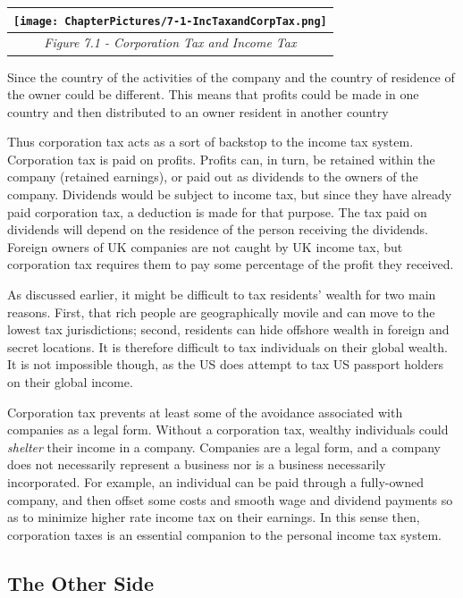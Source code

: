 \documentclass[]{tufte-handout}
\begin{document}
\begin{longtable}[]{@{}c@{}}
\toprule
\texttt{[image: ChapterPictures/7-1-IncTaxandCorpTax.png]}\tabularnewline
\midrule
\endhead
\emph{Figure 7.1 - Corporation Tax and Income Tax}\tabularnewline
\bottomrule
\end{longtable}

Since the country of the activities of the company and the country of
residence of the owner could be different. This means that profits could
be made in one country and then distributed to an owner resident in
another country

Thus corporation tax acts as a sort of backstop to the income tax
system. Corporation tax is paid on profits. Profits can, in turn, be
retained within the company (retained earnings), or paid out as
dividends to the owners of the company. Dividends would be subject to
income tax, but since they have already paid corporation tax, a
deduction is made for that purpose. The tax paid on dividends will
depend on the residence of the person receiving the dividends. Foreign
owners of UK companies are not caught by UK income tax, but corporation
tax requires them to pay some percentage of the profit they received.

As discussed earlier, it might be difficult to tax residents' wealth for
two main reasons. First, that rich people are geographically movile and
can move to the lowest tax jurisdictions; second, residents can hide
offshore wealth in foreign and secret locations. It is therefore
difficult to tax individuals on their global wealth. It is not
impossible though, as the US does attempt to tax US passport holders on
their global income.

Corporation tax prevents at least some of the avoidance associated with
companies as a legal form. Without a corporation tax, wealthy
individuals could \emph{shelter} their income in a company. Companies
are a legal form, and a company does not necessarily represent a
business nor is a business necessarily incorporated. For example, an
individual can be paid through a fully-owned company, and then offset
some costs and smooth wage and dividend payments so as to minimize
higher rate income tax on their earnings. In this sense then,
corporation taxes is an essential companion to the personal income tax
system.

\hypertarget{the-other-side}{%
\subsection{The Other Side}\label{the-other-side}}
\end{document}
